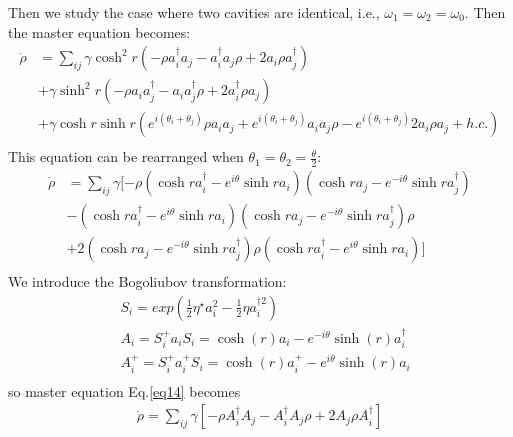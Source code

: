 \documentclass{article}
\begin{document}
Then we study the case where two cavities are identical, i.e., $\omega_1=\omega_2=\omega_0$. Then the master equation becomes:
\begin{equation}
\label{eq13}
\begin{split}
\dot{\rho}&=\sum_{ij}\gamma\cosh^{2}r(-\rho a_{i}^{\dagger}a_{j}-a_{i}^{\dagger}a_{j}\rho+2a_{i}\rho a_{j}^{\dagger})\\
&+\gamma\sinh^{2}r(-\rho a_{i}a_{j}^{\dagger}-a_{i}a_{j}^{\dagger}\rho+2a_{i}^{\dagger}\rho a_{j})\\
&+\gamma\cosh r\sinh r(e^{i(\theta_{i}+\theta_{j})}\rho a_{i}a_{j}+e^{i(\theta_{i}+\theta_{j})}a_{i}a_{j}\rho-e^{i(\theta_{i}+\theta_{j})}2a_{i}\rho a_{j}+h.c.)\\
\end{split}
\end{equation}
This equation can be rearranged when $\theta_1=\theta_2=\frac{\theta}{2}$:
\begin{equation}
\label{eq14}
\begin{split}
\dot{\rho}&=\sum_{ij}\gamma[-\rho(\cosh ra_{i}^{\dagger}-e^{i\theta}\sinh ra_{i})(\cosh ra_{j}-e^{-i\theta}\sinh ra_{j}^{\dagger})\\
&-(\cosh ra_{i}^{\dagger}-e^{i\theta}\sinh ra_{i})(\cosh ra_{j}-e^{-i\theta}\sinh ra_{j}^{\dagger})\rho\\
&+2(\cosh ra_{j}-e^{-i\theta}\sinh ra_{j}^{\dagger})\rho(\cosh ra_{i}^{\dagger}-e^{i\theta}\sinh ra_{i})]\\
\end{split}
\end{equation}
We introduce the Bogoliubov transformation:
\begin{equation}
\label{eq15}
\begin{split}
&S_{i}=exp(\frac{1}{2}\eta^{\star}a_{i}^{2}-\frac{1}{2}\eta a_{i}^{\dagger2})\\
&A_{i}=S_{i}^{+}a_{i}S_{i}=\cosh(r)a_{i}-e^{-i\theta}\sinh(r)a_{i}^{\dagger} \\
&A_{i}^{+}=S_{i}^{+}a_{i}^{+}S_{i}=\cosh(r)a_{i}^{+}-e^{i\theta}\sinh(r)a_{i}\\
\end{split}
\end{equation}
so master equation Eq.\eqref{eq14} becomes
\begin{equation}
\label{eq16}
\begin{split}
\dot{\rho}=\sum_{ij}\gamma[-\rho A_{i}^{\dagger}A_{j}-A_{i}^{\dagger}A_{j}\rho+2A_{j}\rho A_{i}^{\dagger}]
\end{split}
\end{equation}
\end{document}
